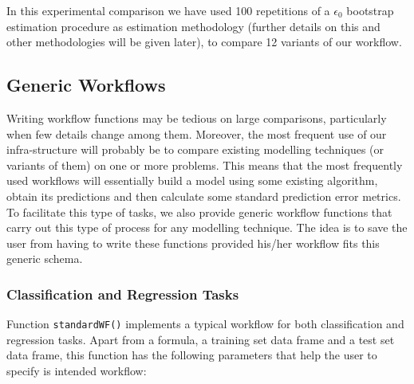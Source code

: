 \documentclass[10pt,a4paper]{article}\usepackage[]{graphicx}\usepackage[]{color}
\begin{document}
In this experimental comparison we have used 100 repetitions of a $\epsilon_0$ 
bootstrap estimation procedure as estimation methodology (further
details on this and other methodologies will be given later), to
compare 12 variants of our workflow. 

\subsection{Generic Workflows}

Writing workflow functions may be tedious on large comparisons,
particularly when few details change among them. Moreover, the most
frequent use of our infra-structure will probably be to compare
existing modelling techniques (or variants of them) on one or more problems. This means that
the most frequently used workflows will essentially build a model
using some existing algorithm, obtain its predictions and then
calculate some standard prediction error metrics. To facilitate this type of tasks, we
also provide generic workflow functions that carry out this type
of process for any modelling technique. The idea is to save the user
from having to write these functions provided his/her workflow fits
this generic schema.

\subsubsection{Classification and Regression Tasks}

Function \texttt{standardWF()} implements a typical workflow for both
classification and regression tasks. Apart from a formula, a training set data frame and a test set data frame, this function has the following parameters that help the user to specify is intended workflow:
\end{document}
